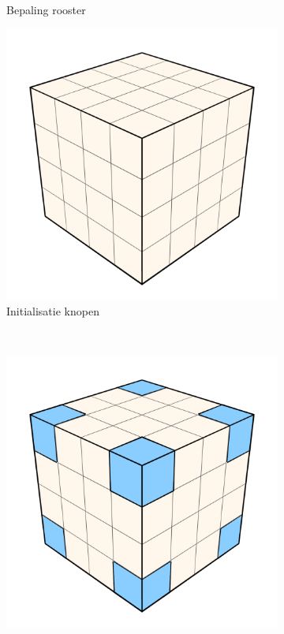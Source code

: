 \begin{figure}[p]
\begin{subfigure}[b]{.3\linewidth}
    \caption{Bepaling rooster}%
    \label{fig:hs-p1b}%
  \end{subfigure}
  \begin{subfigure}[b]{.3\linewidth}
    \includegraphics[width=\textwidth]{./img/raw/hs-slt-algorithm/hs-slt-algorithm-3.png}%
    \caption{Initialisatie knopen}%
    \label{fig:hs-p1c}%
  \end{subfigure}
  \\
  \begin{subfigure}[b]{.3\linewidth}
    \includegraphics[width=\textwidth]{./img/raw/hs-slt-algorithm/hs-slt-algorithm-4.png}%

\end{subfigure}
\end{figure}

